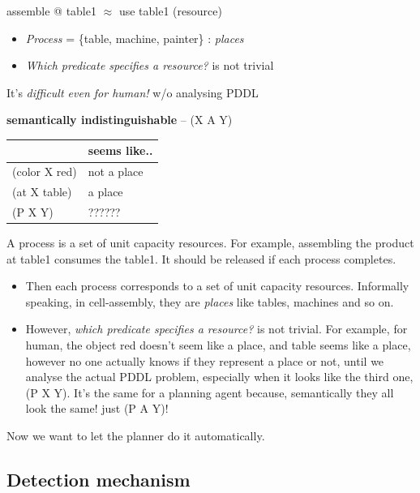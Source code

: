 assemble @ table1 \(\approx\) use table1 (resource)

\begin{itemize}
\item \emph{Process} = \{table, machine, painter\} : \emph{places}
\item \emph{Which predicate specifies a resource?} is not trivial
\end{itemize}

It's \emph{difficult even for human!} w/o analysing PDDL

\textbf{semantically indistinguishable} -- (X A Y)

\begin{larger}
\begin{center}
\begin{tabular}{ll}
 & seems like..\\
\hline
(color X red) & not a place\\
(at X table) & a place\\
(P X Y) & ??????\\
\end{tabular}
\end{center}
\end{larger}

\begin{resume}
A process is a set of unit capacity resources.
For example, assembling the product at table1 consumes the table1.
It should be released if each process completes.

\begin{itemize}
\item Then each process corresponds to a set of unit capacity resources.
Informally speaking, in cell-assembly, they are \emph{places}
like tables, machines and so on.

\item However, \emph{which predicate specifies a resource?} is not trivial.
For example, for human,
the object red doesn't seem like a place,
and table seems like a place,
however no one actually knows if they represent a place or not,
until we analyse the actual PDDL problem,
especially when it looks like the third one, (P X Y).
It's the same for a planning agent because,
semantically they all look the same! just (P A Y)!
\end{itemize}

Now we want to let the planner do it automatically.
\end{resume}

\subsection{Detection mechanism}
\label{sec-7-2}


